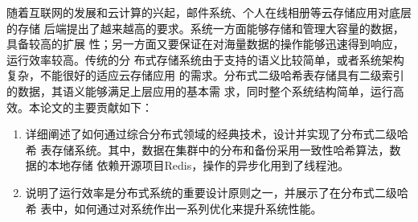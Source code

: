 
\begin{cabstract}
随着互联网的发展和云计算的兴起，邮件系统、个人在线相册等云存储应用对底层的存储
后端提出了越来越高的要求。系统一方面能够存储和管理大容量的数据，具备较高的扩展
性；另一方面又要保证在对海量数据的操作能够迅速得到响应，运行效率较高。传统的分
布式存储系统由于支持的语义比较简单，或者系统架构复杂，不能很好的适应云存储应用
的需求。分布式二级哈希表存储具有二级索引的数据，其语义能够满足上层应用的基本需
求，同时整个系统结构简单，运行高效。本论文的主要贡献如下：
\begin{enumerate}
  \item 详细阐述了如何通过综合分布式领域的经典技术，设计并实现了分布式二级哈希
  表存储系统。其中，数据在集群中的分布和备份采用一致性哈希算法，数据的本地存储
  依赖开源项目Redis，操作的异步化用到了线程池。
  \item 说明了运行效率是分布式系统的重要设计原则之一，并展示了在分布式二级哈希
  表中，如何通过对系统作出一系列优化来提升系统性能。
\end{enumerate}
\end{cabstract}



